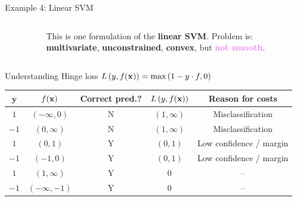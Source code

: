 \documentclass[11pt,compress,t,notes=noshow, xcolor=table]{beamer}
\begin{document}
\begin{vbframe}{Example 4: Linear SVM}
\begin{columns}[T]
\begin{column}{.3\textwidth}
\begin{figure}
\begin{center}
	\end{center}
		\end{figure}
	\end{column}
	\begin{column}{.3\textwidth}
	\vspace*{0.6cm}
	\begin{footnotesize}
	This is one formulation of the \textbf{linear SVM}. Problem is: \textbf{multivariate}, \textbf{unconstrained}, \textbf{convex}, but \textcolor{violet}{\textbf{not smooth}}.  
	\end{footnotesize}
	\end{column}
\end{columns}


\framebreak 

Understanding Hinge loss $L\left(y, f(\mathbf{x})\right) = \max\left(1 - y\cdot f, 0\right)$

\begin{footnotesize}
\begin{center}
\begin{tabular}{ c | c | c | c | c }
$\mathbf{y}$ & $f(\mathbf{x})$ &  \textbf{Correct pred.?}  & $L\left(y, f(\mathbf{x})\right)$ & \textbf{Reason for costs}  \\ \hline
 $1$ & $(- \infty, 0)$  & N & $(1, \infty)$ & Misclassification \\
 $- 1$ & $(0, \infty)$ & N  & $(1, \infty)$ &  Misclassification \\
 $1$ & $(0, 1)$ & Y & $(0, 1)$ & Low confidence / margin \\
 $- 1$ & $(-1, 0)$  & Y  & $(0, 1)$& Low confidence / margin\\
 $1$ & $(1, \infty)$ &  Y & $0$ & -- \\
 $- 1$ & $(- \infty, -1)$ &  Y & $0$ & -- \\
\end{tabular}
\end{center}
\end{footnotesize}

\vspace*{-0.3cm}


\end{vbframe}
\end{document}
